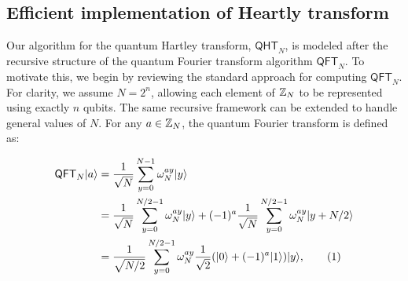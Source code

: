 \documentclass[11pt]{article}
\theoremstyle{definition}
\newcommand\numberthis{\addtocounter{equation}{1}\tag{\theequation}}
\newcommand{\qht}{\mathsf{QHT}}
\newcommand{\qft}{\mathsf{QFT}}
\begin{document}

\subsection*{Efficient implementation of Heartly transform}


Our algorithm for the quantum Hartley transform, \( \qht_N \), is modeled after the recursive structure of the quantum Fourier transform algorithm \( \qft_N \). To motivate this, we begin by reviewing the standard approach for computing \( \qft_N \). For clarity, we assume \( N = 2^n \), allowing each element of \( \mathbb{Z}_N \) to be represented using exactly \( n \) qubits. The same recursive framework can be extended to handle general values of \( N \). For any \( a \in \mathbb{Z}_N \), the quantum Fourier transform is defined as:


\begin{align*}
    \qft_N\ket{a}
    & = \frac{1}{\sqrt{N}} \sum_{y = 0}^{N - 1} \omega_N^{ay}\ket{y} \\
    & = \frac{1}{\sqrt{N}} \sum_{y = 0}^{N / 2 - 1} \omega_N^{ay} \ket{y} + (-1)^a \frac{1}{\sqrt{N}} \sum_{y = 0}^{N / 2 - 1} \omega_N^{ay} \ket{y + N/2} \\
    & = \frac{1}{\sqrt{N / 2}} \sum_{y = 0}^{N / 2 - 1} \omega_N^{ay} \frac{1}{\sqrt{2}} (\ket{0} + (-1)^a \ket{1}) \ket{y}, \numberthis\label{eq:qft_alt}
\end{align*}
\end{document}
